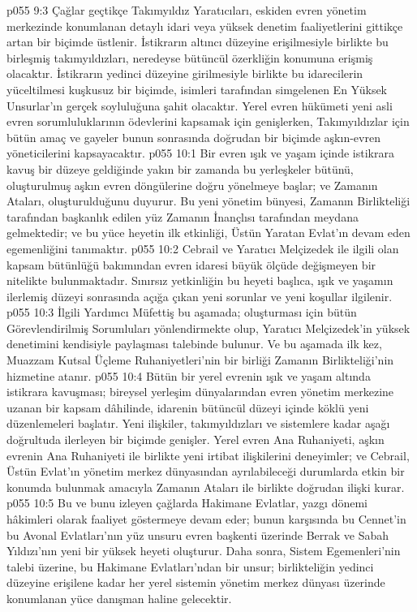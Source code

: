 \vs p055 9:3 Çağlar geçtikçe Takımyıldız Yaratıcıları, eskiden evren yönetim merkezinde konumlanan detaylı idari veya yüksek denetim faaliyetlerini gittikçe artan bir biçimde üstlenir. İstikrarın altıncı düzeyine erişilmesiyle birlikte bu birleşmiş takımyıldızları, neredeyse bütüncül özerkliğin konumuna erişmiş olacaktır. İstikrarın yedinci düzeyine girilmesiyle birlikte bu idarecilerin yüceltilmesi kuşkusuz bir biçimde, isimleri tarafından simgelenen En Yüksek Unsurlar’ın gerçek soyluluğuna şahit olacaktır. Yerel evren hükümeti yeni asli evren sorumluluklarının ödevlerini kapsamak için genişlerken, Takımyıldızlar için bütün amaç ve gayeler bunun sonrasında doğrudan bir biçimde aşkın\hyp{}evren yöneticilerini kapsayacaktır.
\vs p055 10:1 Bir evren ışık ve yaşam içinde istikrara kavuş bir düzeye geldiğinde yakın bir zamanda bu yerleşkeler bütünü, oluşturulmuş aşkın evren döngülerine doğru yönelmeye başlar; ve Zamanın Ataları,  oluşturulduğunu duyurur. Bu yeni yönetim bünyesi, Zamanın Birlikteliği tarafından başkanlık edilen yüz Zamanın İnançlısı tarafından meydana gelmektedir; ve bu yüce heyetin ilk etkinliği, Üstün Yaratan Evlat’ın devam eden egemenliğini tanımaktır.
\vs p055 10:2 Cebrail ve Yaratıcı Melçizedek ile ilgili olan kapsam bütünlüğü bakımından evren idaresi büyük ölçüde değişmeyen bir nitelikte bulunmaktadır. Sınırsız yetkinliğin bu heyeti başlıca, ışık ve yaşamın ilerlemiş düzeyi sonrasında açığa çıkan yeni sorunlar ve yeni koşullar ilgilenir.
\vs p055 10:3 İlgili Yardımcı Müfettiş bu aşamada;  oluşturması için bütün Görevlendirilmiş Sorumluları yönlendirmekte olup, Yaratıcı Melçizedek’in yüksek denetimini kendisiyle paylaşması talebinde bulunur. Ve bu aşamada ilk kez, Muazzam Kutsal Üçleme Ruhaniyetleri’nin bir birliği Zamanın Birlikteliği’nin hizmetine atanır.
\vs p055 10:4 Bütün bir yerel evrenin ışık ve yaşam altında istikrara kavuşması; bireysel yerleşim dünyalarından evren yönetim merkezine uzanan bir kapsam dâhilinde, idarenin bütüncül düzeyi içinde köklü yeni düzenlemeleri başlatır. Yeni ilişkiler, takımyıldızları ve sistemlere kadar aşağı doğrultuda ilerleyen bir biçimde genişler. Yerel evren Ana Ruhaniyeti, aşkın evrenin Ana Ruhaniyeti ile birlikte yeni irtibat ilişkilerini deneyimler; ve Cebrail, Üstün Evlat’ın yönetim merkez dünyasından ayrılabileceği durumlarda etkin bir konumda bulunmak amacıyla Zamanın Ataları ile birlikte doğrudan ilişki kurar.
\vs p055 10:5 Bu ve bunu izleyen çağlarda Hakimane Evlatlar, yazgı dönemi hâkimleri olarak faaliyet göstermeye devam eder; bunun karşısında bu Cennet’in bu Avonal Evlatları’nın yüz unsuru evren başkenti üzerinde Berrak ve Sabah Yıldızı’nın yeni bir yüksek heyeti oluşturur. Daha sonra, Sistem Egemenleri’nin talebi üzerine, bu Hakimane Evlatları’ndan bir unsur; birlikteliğin yedinci düzeyine erişilene kadar her yerel sistemin yönetim merkez dünyası üzerinde konumlanan yüce danışman haline gelecektir.

